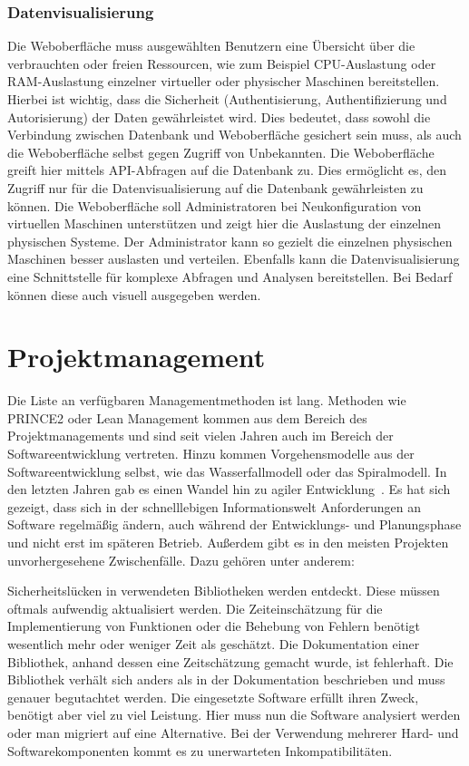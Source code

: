 \subsection{Datenvisualisierung}
Die Weboberfläche muss ausgewählten Benutzern eine Übersicht über die
verbrauchten oder freien Ressourcen, wie zum Beispiel CPU\hyp{}Auslastung oder
RAM\hyp{}Auslastung einzelner virtueller oder physischer Maschinen
bereitstellen.  Hierbei ist wichtig, dass die Sicherheit (Authentisierung,
Authentifizierung und Autorisierung) der Daten gewährleistet wird. Dies
bedeutet, dass sowohl die Verbindung zwischen Datenbank und Weboberfläche
gesichert sein muss, als auch die Weboberfläche selbst gegen Zugriff von
Unbekannten. Die Weboberfläche greift hier mittels API\hyp{}Abfragen auf die
Datenbank zu. Dies ermöglicht es, den Zugriff nur für die Datenvisualisierung
auf die Datenbank gewährleisten zu können. Die Weboberfläche soll
Administratoren bei Neukonfiguration von virtuellen Maschinen unterstützen und
zeigt hier die Auslastung der einzelnen physischen Systeme. Der Administrator
kann so gezielt die einzelnen physischen Maschinen besser auslasten und
verteilen. Ebenfalls kann die Datenvisualisierung eine Schnittstelle für
komplexe Abfragen und Analysen bereitstellen. Bei Bedarf können diese auch
visuell ausgegeben werden.
\mr%

\chapter{Projektmanagement}
Die Liste an verfügbaren Managementmethoden ist lang. Methoden wie PRINCE2 oder
Lean Management kommen aus dem Bereich des Projektmanagements und sind seit
vielen Jahren auch im Bereich der Softwareentwicklung vertreten. Hinzu kommen
Vorgehensmodelle aus der Softwareentwicklung selbst, wie das Wasserfallmodell
oder das Spiralmodell. In den letzten Jahren gab es einen Wandel hin zu agiler
Entwicklung~\cite{beck2001manifesto}. Es hat sich gezeigt, dass sich in der
schnelllebigen Informationswelt Anforderungen an Software regelmäßig ändern,
auch während der Entwicklungs- und Planungsphase und nicht erst im späteren
Betrieb. Außerdem gibt es in den meisten Projekten unvorhergesehene
Zwischenfälle. Dazu gehören unter anderem:

\begin{outline}
  \1 Sicherheitslücken in verwendeten Bibliotheken werden entdeckt. Diese
  müssen oftmals aufwendig aktualisiert werden.
  \1 Die Zeiteinschätzung für die Implementierung von Funktionen oder die
  Behebung von Fehlern benötigt wesentlich mehr oder weniger Zeit als
  geschätzt.
  \1 Die Dokumentation einer Bibliothek, anhand dessen eine Zeitschätzung
  gemacht wurde, ist fehlerhaft. Die Bibliothek verhält sich anders als in der
  Dokumentation beschrieben und muss genauer begutachtet werden.
  \1 Die eingesetzte Software erfüllt ihren Zweck, benötigt aber viel zu viel
  Leistung. Hier muss nun die Software analysiert werden oder man migriert auf
  eine Alternative.
  \1 Bei der Verwendung mehrerer Hard- und Softwarekomponenten kommt es zu
  unerwarteten Inkompatibilitäten.
\end{outline}

